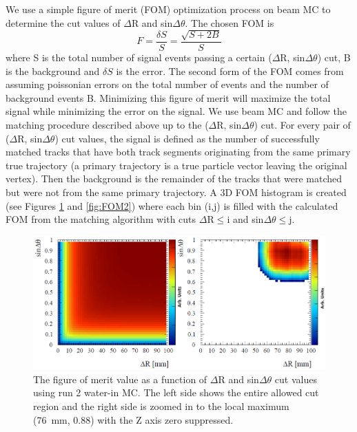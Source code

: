 We use a simple figure of merit (FOM) optimization process on beam MC to determine the cut values of $\Delta$R and sin$\Delta\theta$. The chosen FOM is 
\begin{equation}
F = \frac{\delta S}{S} = \frac{\sqrt{S+2B}}{S}
\end{equation}
\noindent where S is the total number of signal events passing a certain ($\Delta$R, sin$\Delta\theta$) cut, B is the background and $\delta S$ is the error. The second form of the FOM comes from assuming poissonian errors on the total number of events and the number of background events B. Minimizing this figure of merit will maximize the total signal while minimizing the error on the signal. We use beam MC and follow the matching procedure described above up to the  ($\Delta$R, sin$\Delta\theta$) cut. For every pair of  ($\Delta$R, sin$\Delta\theta$) cut values, the signal is defined as the number of successfully matched tracks that have both track segments originating from the same primary true trajectory (a primary trajectory is a true particle vector leaving the original vertex). Then the background is the remainder of the tracks that were matched but were not from the same primary trajectory. A 3D FOM histogram is created (see Figures \ref{fig:FOM1} and \ref{fig:FOM2}) where each bin (i,j) is filled with the calculated FOM from the matching algorithm with cuts $\Delta$R$\leq$i and sin$\Delta\theta\leq$j. 

\begin{figure}
\begin{center}
\includegraphics[width=6in]{Figures/FOM1.png}
\end{center}
\caption{The figure of merit value as a function of $\Delta$R and sin$\Delta\theta$ cut values using run 2 water-in MC. The left side shows the entire allowed cut region and the right side is zoomed in to the local maximum (76~mm, 0.88) with the Z axis zero suppressed.}
\label{fig:FOM1}
\end{figure}

